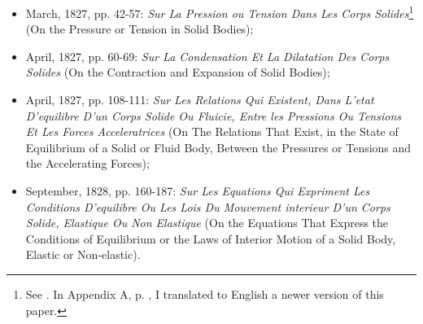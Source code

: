 \begin{itemize}
	\setlength\itemsep{1pt}
	\item[1.] March, 1827, pp. 42-57: \emph{Sur La Pression ou Tension Dans Les Corps Solides}\footnote{See \cite{cauchy_1827}. In Appendix A, p. \pageref{ch:appA}, I translated to English a newer version of this paper.} (On the Pressure or Tension in Solid Bodies);
	\item[2.] April, 1827, pp. 60-69: \emph{Sur La Condensation Et La Dilatation Des Corps Solides} (On the Contraction and Expansion of Solid Bodies);
    \item[3.] April, 1827, pp. 108-111: \emph{Sur Les Relations Qui Existent, Dans L'etat D'equilibre D'un Corps Solide Ou Fluicie, Entre
les Pressions Ou Tensions Et Les Forces Acceleratrices} (On The Relations That Exist, in the State of Equilibrium of a Solid or Fluid Body, Between the Pressures or Tensions and the Accelerating Forces);
	\item[4.] September, 1828, pp. 160-187: \emph{Sur Les Equations Qui Expriment Les Conditions D'equilibre Ou Les Lois Du Mouvement interieur D'un Corps Solide, Elastique Ou Non Elastique} (On the Equations That Express the Conditions of Equilibrium or the Laws of Interior Motion of a Solid Body, Elastic or Non-elastic).
\end{itemize}
